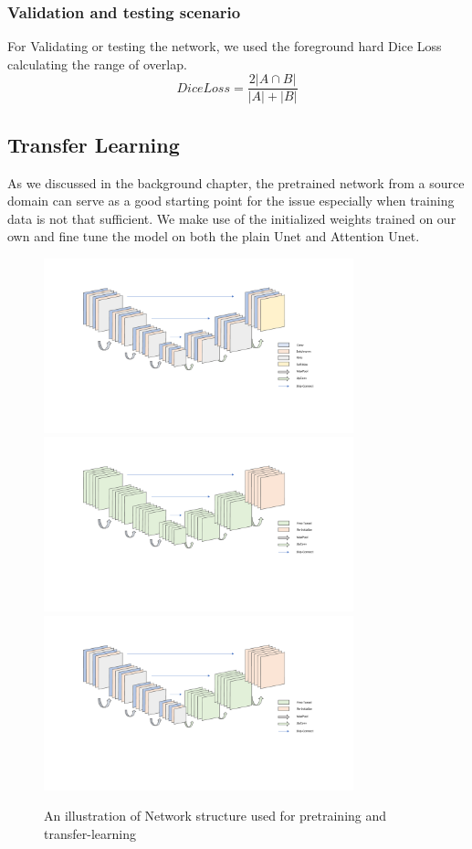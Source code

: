 \subsubsection{Validation and testing scenario}
For Validating or testing the network, we used the foreground hard Dice Loss calculating the range of overlap.
$$Dice Loss = \frac{2|A \cap B|}{|A|+|B|}$$

\subsection{Transfer Learning}
As we discussed in the background chapter, the pretrained network from a source domain can serve as a good starting point for the issue especially when training data is not that sufficient. We make use of the initialized weights trained on our own  and fine tune the model on both the plain Unet and Attention Unet.
\begin{figure}
	\centering
	\includegraphics[width=0.8\textwidth]{img/Networks/Unet-train.pdf}
	\includegraphics[width=0.8\textwidth]{img/Networks/Transfer-Finetune-all.pdf}
	\includegraphics[width=0.8\textwidth]{img/Networks/Transfer-freeze-encoder.pdf}
	\caption{An illustration of Network structure used for pretraining and transfer-learning}
	\label{fig:transfer-learning-graph}
\end{figure}

